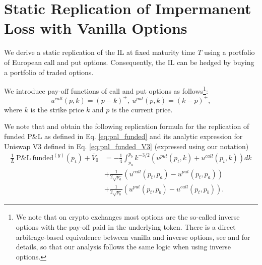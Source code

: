 \documentclass[pdftex,11pt,a4paper] {article}
\begin{document}
\section{Static Replication of Impermanent Loss with Vanilla Options}

\label{sec:sh}

We derive a static replication of the IL at fixed maturity time $T$
using a portfolio of European call and put options. Consequently, the IL can
be hedged by buying a portfolio of traded options.

We introduce pay-off functions of call and put options as follows\footnote{%
We note that on crypto exchanges most options are the so-called inverse
options with the pay-off paid in the underlying token. There is a direct
arbitrage-based equivalence between vanilla and inverse options, see %
\citet{Alexander2023} and \citet{LucicSepp2024} for details, so that our
analysis follows the same logic when using inverse options.}:
\begin{equation}  \label{eq:sr0}
u^{call}(p, k)=(p-k)^{+}, \ u^{put}(p, k)=(k-p)^{+},
\end{equation}
where $k$ is the strike price $k$ and $p$ is the current price.

We note that \cite{Deng2023} and \cite{MaireWunsch2024} obtain the following
replication formula for the replication of funded P\&L as defined in Eq. %
\eqref{eq:pnl_funded} and its analytic expression for Uniswap V3 defined in
Eq. \eqref{eq:pnl_funded_V3} (expressed using our notation)
\begin{equation}  \label{eq:sr1}
\begin{split}
\frac{1}{L} \ \mathrm{P\&L \ funded}^{(y)}(p_{t}) + \bar{V}_{0} & = -\frac{1}{4}
\int^{p_{b}}_{p_{a}}k^{-3/2}\left(u^{put}(p_{t}, k)+u^{call}(p_{t},
k)\right)dk \\
& + \frac{1}{2\sqrt{p_{a}}}\left(u^{call}(p_{t}, p_{a})-u^{put}(p_{t},
p_{a})\right) \\
& + \frac{1}{2\sqrt{p_{b}}}\left(u^{put}(p_{t},
p_{b})-u^{call}(p_{t}, p_{b})\right).
\end{split}%
\end{equation}
\end{document}
